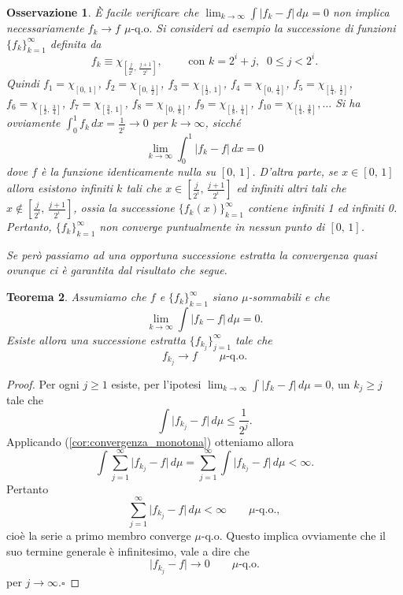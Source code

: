 \documentclass[a4paper,10pt,openright,oneside]{book}
\theoremstyle{theoremstyle}
\newtheorem{teorema}{Teorema}[section]
\theoremstyle{theoremstylewoheader}
\theoremstyle{theoremstyle}
\newtheorem{osservazione}[teorema]{Osservazione}
\theoremstyle{proofsecstyle}
\theoremstyle{nonumberplain}
\newtheorem{proof}{Dim.}
\newcommand{\abs}[1]{\ensuremath{\lvert #1 \rvert}}
\newcommand{\qo}[1]{\ensuremath{#1\text{-q.o.}}}
\renewcommand{\qedsymbol}{\ensuremath{\square}}
\newcommand{\qed}{\unskip\nobreak\hfill\nobreak\hspace{.5em}\qedsymbol}
\begin{document}
\begin{osservazione}
\`E facile verificare che $\lim_{k \to \infty} \int \abs{f_k - f}\, d\mu = 0$ \emph{non} implica necessariamente  $f_k \to f$ $\qo{\mu}$ Si consideri ad esempio la successione di funzioni $\{f_k\}_{k=1}^\infty$ definita da
\[
f_k \equiv \chi_{\left[\frac{j}{2^i},\, \frac{j+1}{2^i}\right]},\qquad\text{ con $k = 2^i + j,\;\; 0 \le j < 2^i$.}
\]
Quindi $f_1 = \chi_{[0,\, 1]}$, $f_2 = \chi_{\left[0,\, \frac{1}{2}\right]}$, $f_3 = \chi_{\left[\frac{1}{2},\, 1\right]}$, $f_4 = \chi_{\left[0,\, \frac{1}{4}\right]}$, $f_5 = \chi_{\left[\frac{1}{4},\, \frac{1}{2}\right]}$, $f_6 = \chi_{\left[\frac{1}{2},\, \frac{3}{4}\right]}$, $f_7 = \chi_{\left[\frac{3}{4},\, 1\right]}$, $f_8 = \chi_{\left[0,\, \frac{1}{8}\right]}$, $f_9 = \chi_{\left[\frac{1}{8},\, \frac{1}{4}\right]}$, $f_{10} = \chi_{\left[\frac{1}{4},\, \frac{3}{8}\right]}, \ldots$ Si ha ovviamente $\int_0^1 f_k\, dx = \frac{1}{2^i} \to 0$ per $k \to \infty$, sicché
\[
\lim_{k \to \infty} \int_0^1 \abs{f_k - f}\, dx = 0
\]
dove $f$ è la funzione identicamente nulla su $[0,\, 1]$. D'altra parte, se $x \in [0,\, 1]$ allora esistono infiniti $k$ tali che $x \in \left[\frac{j}{2^i},\, \frac{j+1}{2^i}\right]$ ed infiniti altri tali che $x \notin \left[\frac{j}{2^i},\, \frac{j+1}{2^i}\right]$, ossia la successione $\{f_k(x)\}_{k=1}^\infty$ contiene infiniti 1 ed infiniti 0. Pertanto, $\{f_k\}_{k=1}^\infty$ \emph{non} converge puntualmente in nessun punto di $[0,\, 1]$.

Se però passiamo ad una opportuna successione estratta la convergenza quasi ovunque ci è garantita dal risultato che segue.
\end{osservazione}

\begin{teorema}
Assumiamo che $f$ e $\{f_k\}_{k=1}^\infty$ siano $\mu$-sommabili e che
\[
\lim_{k \to \infty} \int \abs{f_k - f}\, d\mu = 0.
\]
Esiste allora una successione estratta $\{f_{k_j}\}_{j=1}^\infty$ tale che
\[
f_{k_j} \to f\qquad \qo{\mu}
\]
\end{teorema}

\begin{proof}
Per ogni $j \ge 1$ esiste, per l'ipotesi $\lim_{k \to \infty} \int \abs{f_k - f}\, d\mu = 0$, un $k_j \ge j$ tale che
\[
\int \abs{f_{k_j} - f}\, d\mu \le \frac{1}{2^j}.
\]
Applicando (\ref{cor:convergenza_monotona}) otteniamo allora
\[
\int \sum_{j=1}^\infty \abs{f_{k_j} - f}\, d\mu = \sum_{j=1}^\infty \int \abs{f_{k_j} - f}\, d\mu < \infty.
\]
Pertanto
\[
\sum_{j=1}^\infty \abs{f_{k_j} - f}\, d\mu < \infty\qquad \qo{\mu},
\]
cioè la serie a primo membro converge $\qo{\mu}$ Questo implica ovviamente che il suo termine generale è infinitesimo, vale a dire che
\[
\abs{f_{k_j} - f} \to 0\qquad \qo{\mu}
\]
per $j \to \infty$.\qed
\end{proof}
\end{document}
